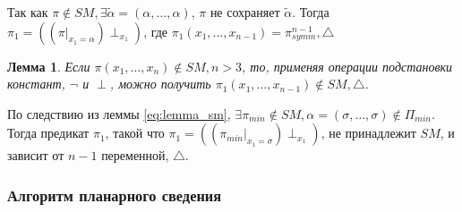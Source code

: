 \documentclass[12pt]{article}
\newtheorem{lemma}[theorem]{Лемма}
\newenvironment{proof}[1][Доказательство]{\begin{trivlist}
\item[\hskip \labelsep {\bfseries #1}]}{\end{trivlist}}
\begin{document}
\begin{proof}
Так как 
$\pi \notin SM, \exists \widetilde{\alpha} = (\alpha, \dots, \alpha)$, $\pi$ не сохраняет $\widetilde{\alpha}$.
Тогда 
$\pi_1 = ( (\pi|_{x_1=\alpha}) \perp_{x_1} )$, где $\pi_1(x_1, \dots, x_{n-1}) = \pi_{symm}^{n-1}, \bigtriangleup$
\end{proof}

\begin{lemma}
\label{eq:svedenie2}
Если $\pi(x_1, \dots, x_n) \notin SM, n > 3$, то, применяя операции подстановки констант, $\neg$ и $\perp$,
можно получить $\pi_1(x_1, \dots, x_{n-1}) \notin SM, \bigtriangleup$.
\end{lemma}

\begin{proof}
По следствию из леммы \ref{eq:lemma_sm}, 
$\exists \pi_{min} \notin SM, \alpha=(\sigma, \dots, \sigma) \notin \Pi_{min}$. Тогда предикат $\pi_1$, такой что
$\pi_1 = ( (\pi_{min}|_{x_1=\sigma}) \perp_{x_1} )$, не принадлежит $SM$, и зависит от $n-1$ переменной, $\bigtriangleup$.
\end{proof}

\subsubsection{Алгоритм планарного сведения}
\end{document}

